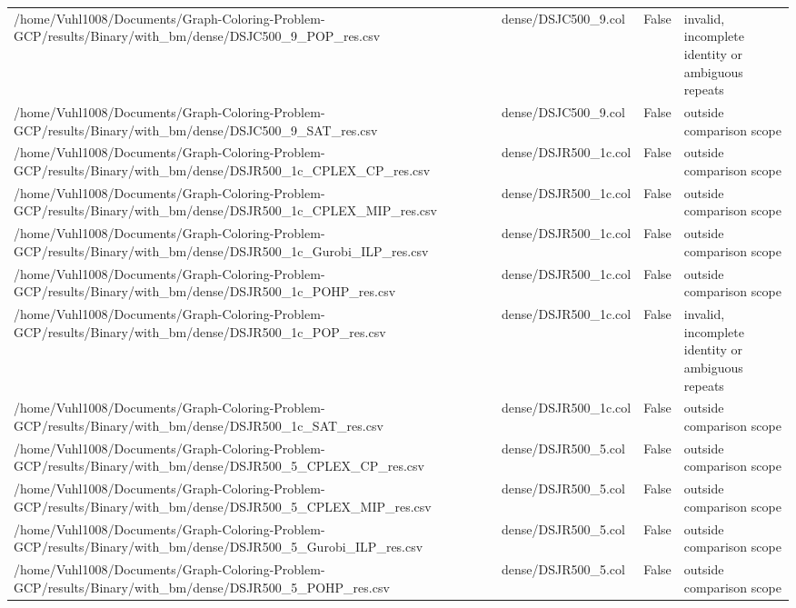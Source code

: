 \begin{table}[htbp]
\begin{tabular}{llll}
/home/Vuhl1008/Documents/Graph-Coloring-Problem-GCP/results/Binary/with\_bm/dense/DSJC500\_9\_POP\_res.csv & dense/DSJC500\_9.col & False & invalid, incomplete identity or ambiguous repeats \\
/home/Vuhl1008/Documents/Graph-Coloring-Problem-GCP/results/Binary/with\_bm/dense/DSJC500\_9\_SAT\_res.csv & dense/DSJC500\_9.col & False & outside comparison scope \\
/home/Vuhl1008/Documents/Graph-Coloring-Problem-GCP/results/Binary/with\_bm/dense/DSJR500\_1c\_CPLEX\_CP\_res.csv & dense/DSJR500\_1c.col & False & outside comparison scope \\
/home/Vuhl1008/Documents/Graph-Coloring-Problem-GCP/results/Binary/with\_bm/dense/DSJR500\_1c\_CPLEX\_MIP\_res.csv & dense/DSJR500\_1c.col & False & outside comparison scope \\
/home/Vuhl1008/Documents/Graph-Coloring-Problem-GCP/results/Binary/with\_bm/dense/DSJR500\_1c\_Gurobi\_ILP\_res.csv & dense/DSJR500\_1c.col & False & outside comparison scope \\
/home/Vuhl1008/Documents/Graph-Coloring-Problem-GCP/results/Binary/with\_bm/dense/DSJR500\_1c\_POHP\_res.csv & dense/DSJR500\_1c.col & False & outside comparison scope \\
/home/Vuhl1008/Documents/Graph-Coloring-Problem-GCP/results/Binary/with\_bm/dense/DSJR500\_1c\_POP\_res.csv & dense/DSJR500\_1c.col & False & invalid, incomplete identity or ambiguous repeats \\
/home/Vuhl1008/Documents/Graph-Coloring-Problem-GCP/results/Binary/with\_bm/dense/DSJR500\_1c\_SAT\_res.csv & dense/DSJR500\_1c.col & False & outside comparison scope \\
/home/Vuhl1008/Documents/Graph-Coloring-Problem-GCP/results/Binary/with\_bm/dense/DSJR500\_5\_CPLEX\_CP\_res.csv & dense/DSJR500\_5.col & False & outside comparison scope \\
/home/Vuhl1008/Documents/Graph-Coloring-Problem-GCP/results/Binary/with\_bm/dense/DSJR500\_5\_CPLEX\_MIP\_res.csv & dense/DSJR500\_5.col & False & outside comparison scope \\
/home/Vuhl1008/Documents/Graph-Coloring-Problem-GCP/results/Binary/with\_bm/dense/DSJR500\_5\_Gurobi\_ILP\_res.csv & dense/DSJR500\_5.col & False & outside comparison scope \\
/home/Vuhl1008/Documents/Graph-Coloring-Problem-GCP/results/Binary/with\_bm/dense/DSJR500\_5\_POHP\_res.csv & dense/DSJR500\_5.col & False & outside comparison scope \\

\end{tabular}
\end{table}
